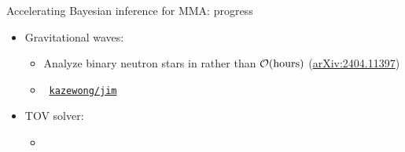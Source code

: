 \documentclass[usenames,dvipsnames,t]{beamer}
\begin{document}
\begin{frame}{Accelerating Bayesian inference for MMA: progress}

  \def\x{4mm}
  \def\y{2mm}

  \begin{itemize}

    \item Gravitational waves: 
    \vspace{\y}
    \begin{itemize}
      \item Analyze binary neutron stars in  rather than $\mathcal{O}(\rm{hours})$ (\href{https://arxiv.org/abs/2404.11397}{arXiv:2404.11397})
      
      \vspace{\y}
      
      \item \faGithub~\href{https://github.com/kazewong/jim}{\texttt{kazewong/jim}}
    \end{itemize}

    \vspace{\x}
    
      
    

    


    \item TOV solver: 
    \vspace{\y}
    \begin{itemize}
      \item {}
      

\end{itemize}
\end{itemize}
\end{frame}
\end{document}
